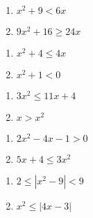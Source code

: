 \begin{multicols}{2}
\begin{enumerate}
\setcounter{enumi}{\value{HW}}


\item  $x^2+9 < 6x$
\item  $9x^2 + 16 \geq 24x$


\setcounter{HW}{\value{enumi}}
\end{enumerate}
\end{multicols}

\begin{multicols}{2}
\begin{enumerate}
\setcounter{enumi}{\value{HW}}

\item  $x^2+4 \leq 4x$
\item $x^{2} + 1 < 0$


\setcounter{HW}{\value{enumi}}
\end{enumerate}
\end{multicols}

\begin{multicols}{2}
\begin{enumerate}
\setcounter{enumi}{\value{HW}}

\item $3x^{2} \leq 11x + 4$
\item $x > x^{2}$


\setcounter{HW}{\value{enumi}}
\end{enumerate}
\end{multicols}

\begin{multicols}{2}
\begin{enumerate}
\setcounter{enumi}{\value{HW}}

\item  $2x^2-4x-1 > 0$
\item  $5x+4 \leq 3x^2$


\setcounter{HW}{\value{enumi}}
\end{enumerate}
\end{multicols}

\begin{multicols}{2}
\begin{enumerate}
\setcounter{enumi}{\value{HW}}

\item $2 \leq |x^{2} - 9| < 9$
\item $x^{2} \leq |4x - 3|$

\setcounter{HW}{\value{enumi}}
\end{enumerate}
\end{multicols}


